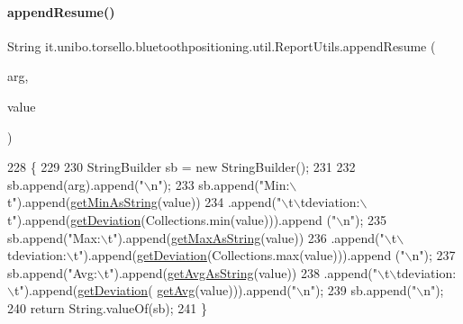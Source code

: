 \paragraph{\texorpdfstring{append\+Resume()}{appendResume()}}
{\footnotesize\ttfamily String it.\+unibo.\+torsello.\+bluetoothpositioning.\+util.\+Report\+Utils.\+append\+Resume (\begin{DoxyParamCaption}\item[{String}]{arg,  }\item[{Array\+List$<$ Double $>$}]{value }\end{DoxyParamCaption})\hspace{0.3cm}{\ttfamily [private]}}


\begin{DoxyCode}
228                                                                      \{
229 
230         StringBuilder sb = \textcolor{keyword}{new} StringBuilder();
231 
232         sb.append(arg).append(\textcolor{stringliteral}{"\(\backslash\)n"});
233         sb.append(\textcolor{stringliteral}{"Min:\(\backslash\)t"}).append(\hyperlink{classit_1_1unibo_1_1torsello_1_1bluetoothpositioning_1_1util_1_1ReportUtils_ad44a97d58ebf0e48fc15b573be05eae9_ad44a97d58ebf0e48fc15b573be05eae9}{getMinAsString}(value))
234                 .append(\textcolor{stringliteral}{"\(\backslash\)t\(\backslash\)tdeviation:\(\backslash\)t"}).append(\hyperlink{classit_1_1unibo_1_1torsello_1_1bluetoothpositioning_1_1util_1_1ReportUtils_af24755a01c03201bca86e0c2e03cf81d_af24755a01c03201bca86e0c2e03cf81d}{getDeviation}(Collections.min(value))).append
      (\textcolor{stringliteral}{"\(\backslash\)n"});
235         sb.append(\textcolor{stringliteral}{"Max:\(\backslash\)t"}).append(\hyperlink{classit_1_1unibo_1_1torsello_1_1bluetoothpositioning_1_1util_1_1ReportUtils_ada05f889f861205ac0687db4442cad63_ada05f889f861205ac0687db4442cad63}{getMaxAsString}(value))
236                 .append(\textcolor{stringliteral}{"\(\backslash\)t\(\backslash\)tdeviation:\(\backslash\)t"}).append(\hyperlink{classit_1_1unibo_1_1torsello_1_1bluetoothpositioning_1_1util_1_1ReportUtils_af24755a01c03201bca86e0c2e03cf81d_af24755a01c03201bca86e0c2e03cf81d}{getDeviation}(Collections.max(value))).append
      (\textcolor{stringliteral}{"\(\backslash\)n"});
237         sb.append(\textcolor{stringliteral}{"Avg:\(\backslash\)t"}).append(\hyperlink{classit_1_1unibo_1_1torsello_1_1bluetoothpositioning_1_1util_1_1ReportUtils_a174ea1d2c8b7e5effd484c65d1b5488c_a174ea1d2c8b7e5effd484c65d1b5488c}{getAvgAsString}(value))
238                 .append(\textcolor{stringliteral}{"\(\backslash\)t\(\backslash\)tdeviation:\(\backslash\)t"}).append(\hyperlink{classit_1_1unibo_1_1torsello_1_1bluetoothpositioning_1_1util_1_1ReportUtils_af24755a01c03201bca86e0c2e03cf81d_af24755a01c03201bca86e0c2e03cf81d}{getDeviation}(
      \hyperlink{classit_1_1unibo_1_1torsello_1_1bluetoothpositioning_1_1util_1_1ReportUtils_a4efc733750ef3ab7dddb613291bff1c4_a4efc733750ef3ab7dddb613291bff1c4}{getAvg}(value))).append(\textcolor{stringliteral}{"\(\backslash\)n"});
239         sb.append(\textcolor{stringliteral}{"\(\backslash\)n"});
240         \textcolor{keywordflow}{return} String.valueOf(sb);
241     \}
\end{DoxyCode}
